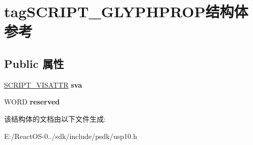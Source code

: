 \hypertarget{structtag_s_c_r_i_p_t___g_l_y_p_h_p_r_o_p}{}\section{tag\+S\+C\+R\+I\+P\+T\+\_\+\+G\+L\+Y\+P\+H\+P\+R\+O\+P结构体 参考}
\label{structtag_s_c_r_i_p_t___g_l_y_p_h_p_r_o_p}
\subsection*{Public 属性}
\begin{DoxyCompactItemize}
\item 
\mbox{\label{structtag_s_c_r_i_p_t___g_l_y_p_h_p_r_o_p_a4c0276445cf49d51f2b303b3b084fab7}} 
\hyperlink{structtag___s_c_r_i_p_t___v_i_s_a_t_t_r}{S\+C\+R\+I\+P\+T\+\_\+\+V\+I\+S\+A\+T\+TR} {\bfseries sva}
\item 
\mbox{\label{structtag_s_c_r_i_p_t___g_l_y_p_h_p_r_o_p_a1d827884b7aeb09faadacb1c4a42eb32}} 
W\+O\+RD {\bfseries reserved}
\end{DoxyCompactItemize}


该结构体的文档由以下文件生成\+:\begin{DoxyCompactItemize}
\item 
E\+:/\+React\+O\+S-\/0../sdk/include/psdk/usp10.\+h\end{DoxyCompactItemize}
